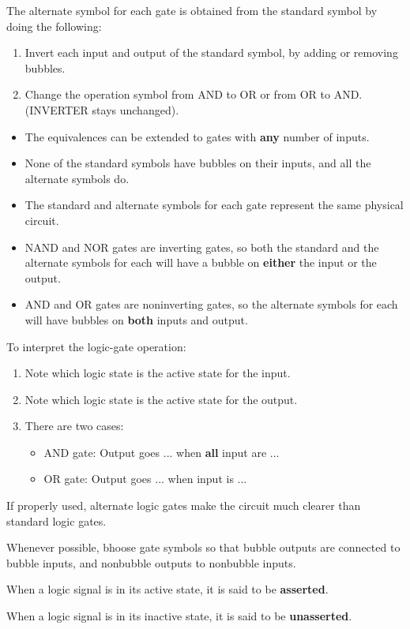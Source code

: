     \par The alternate symbol for each gate is obtained from the standard
    symbol by doing the following:
    \begin{enumerate}
      \item Invert each input and output of the standard symbol, by adding or removing bubbles.
      \item Change the operation symbol from AND to OR or from OR to AND.
        (INVERTER stays unchanged).
    \end{enumerate}
    \begin{itemize}
      \item The equivalences can be extended to gates with \textbf{any} number of inputs.
      \item None of the standard symbols have bubbles on their inputs, and all the alternate
        symbols do.
      \item The standard and alternate symbols for each gate represent the same physical
        circuit.
      \item NAND and NOR gates are inverting gates, so both the standard and the alternate
        symbols for each will have a bubble on \textbf{either} the input or the output.
      \item AND and OR gates are noninverting gates, so the alternate symbols for each will
        have bubbles on \textbf{both} inputs and output.
    \end{itemize}
    \par To interpret the logic-gate operation:
    \begin{enumerate}
      \item Note which logic state is the active state for the input.
      \item Note which logic state is the active state for the output.
      \item There are two cases:
        \begin{itemize}
          \item AND gate: Output goes ... when \textbf{all} input are ...
          \item OR gate: Output goes ... when  input is ...
        \end{itemize}
    \end{enumerate}

    \par If properly used, alternate logic gates make the circuit much clearer than standard
    logic gates.
    \par Whenever possible, bhoose gate symbols so that bubble outputs are connected to bubble
    inputs, and nonbubble outputs to nonbubble inputs.
    \par When a logic signal is in its active state, it is said to be \textbf{asserted}.
    \par When a logic signal is in its inactive state, it is said to be \textbf{unasserted}.

